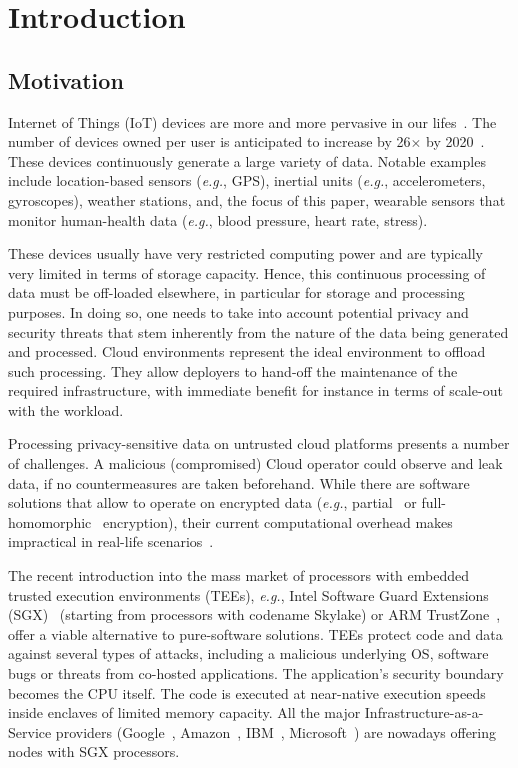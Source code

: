 \chapter{Introduction} \label{chap:introduction}

\section{Motivation}

Internet of Things (IoT) devices are more and more pervasive in our lifes~\cite{Gartner2017}.
The number of devices owned per user is anticipated to increase by 26$\times$ by 2020~\cite{Barbosa2017}.
These devices continuously generate a large variety of data.
Notable examples include location-based sensors (\emph{e.g.}, GPS), inertial units (\emph{e.g.}, accelerometers, gyroscopes), weather stations, and, the focus of this paper, wearable sensors that monitor human-health data (\emph{e.g.}, blood pressure, heart rate, stress).

These devices usually have very restricted computing power and are typically very limited in terms of storage capacity.
Hence, this continuous processing of data must be off-loaded elsewhere, in particular for storage and processing purposes.
In doing so, one needs to take into account potential privacy and security threats that stem inherently from the nature of the data being generated and processed.
Cloud environments represent the ideal environment to offload such processing.
They allow deployers to hand-off the maintenance of the required infrastructure, with immediate benefit for instance in terms of scale-out with the workload. 

Processing privacy-sensitive data on untrusted cloud platforms presents a number of challenges.
A malicious (compromised) Cloud operator could observe and leak data, if no countermeasures are taken beforehand.
While there are software solutions that allow to operate on encrypted data (\emph{e.g.}, partial~\cite{Paillier1999} or full-homomorphic~\cite{Gentry2012} encryption), their current computational overhead makes  impractical in real-life scenarios~\cite{gottel2018security}.

The recent introduction into the mass market of processors with embedded trusted execution environments (TEEs), \emph{e.g.}, Intel Software Guard Extensions (SGX)~\cite{costan2016intel} (starting from processors with codename Skylake) or ARM TrustZone~\cite{trustzone}, offer a viable alternative to pure-software solutions.
TEEs protect code and data against several types of attacks, including a malicious underlying OS, software bugs or threats from co-hosted applications.
The application's security boundary becomes the CPU itself.
The code is executed at near-native execution speeds inside enclaves of limited memory capacity.
All the major Infrastructure-as-a-Service providers (Google~\cite{gceskylake}, Amazon~\cite{amazonskylake}, IBM~\cite{ibm-sgx}, Microsoft~\cite{azureconfidential}) are nowadays offering nodes with SGX processors.

